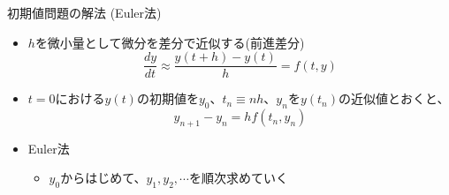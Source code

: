 \begin{frame}[t,fragile]{初期値問題の解法 (Euler法)}
  \begin{itemize}
    \setlength{\itemsep}{1em}
  \item $h$を微小量として微分を差分で近似する(前進差分)
    \[
    \frac{dy}{dt} \approx \frac{y(t+h) - y(t)}{h} = f(t, y)
    \]
  \item $t=0$における$y(t)$の初期値を$y_0$、$t_n \equiv nh$、$y_n$を$y(t_n)$の近似値とおくと、
    \[
    y_{n+1}-y_n = h f( t_n, y_n)
    \]
  \item Euler法
    \begin{itemize}
    \item $y_0$からはじめて、$y_1,y_2,\cdots$を順次求めていく
    \end{itemize}
  \end{itemize}
\end{frame}

